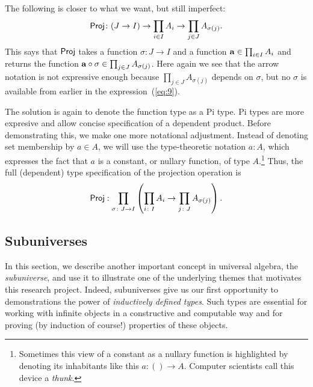 \documentclass[11pt]{amsart}  %
\begin{document}
The following is closer to what we want, but still imperfect:
\begin{equation}
  \label{eq:9}
  \operatorname{\mathsf{Proj}}\colon (J \rightarrow I)\rightarrow \prod_{i\in I} A_{i} \rightarrow 
  \prod_{j\in J} A_{\sigma(j)}.
\end{equation}
This says that $\operatorname{\mathsf{Proj}}$ takes a function 
$\sigma \colon J \rightarrow I$ and a function
$\mathbf{a} \in \prod_{i\in I} A_{i}$ and returns the function 
$\mathbf{a} \circ \sigma \in \prod_{j\in J} A_{\sigma(j)}$.  
Here again we see that the arrow notation is not expressive enough
because $\prod_{j\in J} A_{\sigma(j)}$ depends on $\sigma$, but no $\sigma$
is available from earlier in the expression~(\ref{eq:9}).

The solution is again to denote the function type as a Pi type.
Pi types are more expresive and allow concise specification of a dependent
product.  Before demonstrating this, we make one more notational adjustment.  
Instead of denoting set membership by $a \in A$, we will use the 
type-theoretic notation $a \colon A$, which
expresses the fact that $a$ is a constant, or nullary function, of type $A$.\footnote{Sometimes
this view of a constant as a nullary function is highlighted by denoting 
its inhabitants like this $a \colon () \to A$. Computer scientists call this device a \emph{thunk}.} 
Thus, the full (dependent) type specification of the projection operation is
\[
\operatorname{\mathsf{Proj}}: \prod_{\sigma \colon J \rightarrow I}\left( \prod_{i\colon I} A_{i} \rightarrow 
\prod_{j\colon J} A_{\sigma(j)}\right).
\]
\fi







\subsection{Subuniverses}
\label{sec:subuniverses}
In this section, we describe another important concept in universal 
algebra, the \emph{subuniverse}, and use it to illustrate one of the underlying themes that motivates this research project.
Indeed, subuniverses give us our first opportunity to demonstrations the power of \emph{inductively defined types}. Such types are essential for working with infinite objects in a constructive and computable way and for proving (by induction of course!) properties of these objects. 
\end{document}
